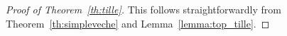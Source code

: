 \begin{proof}[Proof of Theorem~\ref{th:tille}]
    This follows straightforwardly 
    from Theorem~\ref{th:simpleveche} and Lemma~\ref{lemma:top_tille}.
\end{proof}





